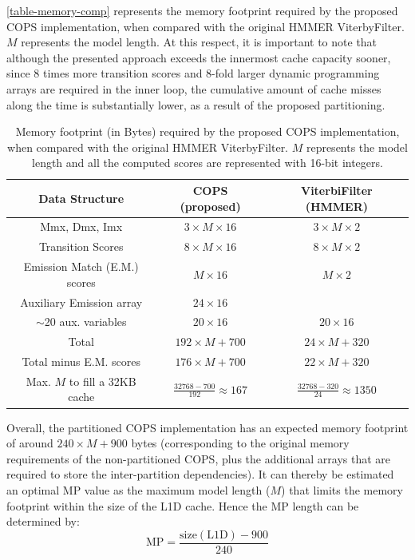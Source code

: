 \documentclass{bmcart}
\begin{document}

\autoref{table-memory-comp} represents the memory footprint required by the proposed \ac{COPS} implementation, when compared with the original HMMER ViterbyFilter. $M$ represents the model length. At this respect, it is important to note that although the presented approach exceeds the innermost cache capacity sooner, since 8 times more transition scores and 8-fold larger dynamic programming arrays are required in the inner loop, the cumulative amount of cache misses along the time is substantially lower, as a result of the proposed partitioning.

\begin{table}[h!]
\centering
\caption{Memory footprint (in Bytes) required by the proposed \ac{COPS} implementation, when compared with the original HMMER ViterbyFilter. $M$ represents the model length and all the computed scores are represented with 16-bit integers.}
\label{table-memory-comp}

\begin{tabular}{ccc}
\hline
	\textbf{Data Structure} & \textbf{COPS (proposed)}      &   \textbf{ViterbiFilter (HMMER)}   \\ \hline
	Mmx, Dmx, Imx	&	$3 \times M \times 16 $	& $3 \times M \times 2$	\\ %
	Transition Scores	&	$8 \times M \times 16 $	& $8 \times M \times 2$	\\ %
	Emission Match (E.M.) scores &	$M  \times 16 $		& $M \times 2$		\\ %
	Auxiliary Emission array &	$24 \times 16 $		&  \textendash		\\ %
	$\sim$20 aux. variables	&	$20 \times 16 $		& $20 \times 16$	\\ \hline %
	Total			&	$192 \times M +700$	& $24 \times M  + 320$	\\ %
	Total minus E.M. scores &	$176 \times M + 700$	& $22 \times M + 320$	\\ %
	Max. $M$ to fill a 32KB cache &	$\frac{32768-700}{192} \approx 167 $	&  $\frac{32768-320}{24} \approx 1350 $ \\ \hline
\end{tabular}
\end{table}

Overall, the partitioned \ac{COPS} implementation has an expected memory footprint of around $240\times M + 900$ bytes (corresponding to the original memory requirements of the non-partitioned \ac{COPS}, plus the additional arrays that are required to store the inter-partition dependencies). It can thereby be estimated an optimal \ac{MP} value as the maximum model length ($M$) that limits the memory footprint within the size of the \ac{L1D} cache. Hence the \ac{MP} length can be determined by:
\begin{equation}
\mathrm{MP} = \frac{ \mathrm{size(L1D)} - 900}{240}
\end{equation}
\end{document}
